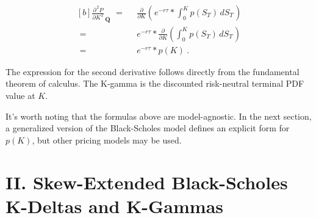 \documentclass[12pt]{article}
\begin{document}
\vspace{5pt}

\begin{equation}
\begin{aligned}[b]
\frac{\partial^{\hspace{2pt} 2} P}{\partial K^{\hspace{1pt} 2}}_{\hspace{2pt} \mathbf{Q}}   \hspace{4pt} =& \hspace{7pt}   \frac{\partial}{\partial K}(\hspace{1pt}  e^{-r \tau} * \int_{0}^{K} p(S_{T}) \hspace{2pt} dS_{T} \hspace{1pt})
\\[12pt]
\hspace{4pt} =& \hspace{7pt}   e^{-r \tau} * \frac{\partial}{\partial K}(\int_{0}^{K} p(S_{T}) \hspace{2pt} dS_{T} \hspace{1pt})
\\[12pt]
\hspace{4pt} =& \hspace{7pt}   e^{-r \tau} * p(K) \hspace{3pt}.
\end{aligned}
\end{equation}

\vspace{5pt}

\begin{paragraph}
\indent The expression for the second derivative follows directly from the fundamental theorem of calculus. The K-gamma is the discounted risk-neutral terminal PDF value at $K$.
\end{paragraph}

\begin{paragraph}
\indent It's worth noting that the formulas above are model-agnostic. In the next section, a generalized version of the Black-Scholes model defines an explicit form for $p(K)$, but other pricing models may be used.
\end{paragraph}

\vspace{15pt}

\section*{\large II. \indent Skew-Extended Black-Scholes K-Deltas and K-Gammas}
\end{document}
